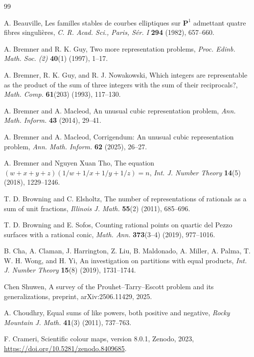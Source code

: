 \documentclass[10pt]{article}
\begin{document}
\begin{thebibliography}{99}

A. Beauville, Les familles stables de courbes elliptiques sur $\mathbf{P}^1$ admettant quatre fibres singuli\`eres, \textit{C. R. Acad. Sci., Paris, S\'er. I} \textbf{294} (1982), 657--660.

A. Bremner and R. K. Guy, Two more representation problems, \textit{Proc. Edinb. Math. Soc. (2)} \textbf{40}(1) (1997), 1--17.

A. Bremner, R. K. Guy, and R. J. Nowakowski, Which integers are representable as the product of the sum of three integers with the sum of their reciprocals?, \textit{Math. Comp.} \textbf{61}(203) (1993), 117--130.

A. Bremner and A. Macleod, An unusual cubic representation problem, \textit{Ann. Math. Inform.} \textbf{43} (2014), 29--41.

A. Bremner and A. Macleod, Corrigendum: An unusual cubic representation problem, \textit{Ann. Math. Inform.} \textbf{62} (2025), 26--27.

A. Bremner and Nguyen Xuan Tho, The equation $(w+x+y+z)(1/w+1/x+1/y+1/z)=n$, \textit{Int. J. Number Theory} \textbf{14}(5) (2018), 1229--1246.

T. D. Browning and C. Elsholtz, The number of representations of rationals as a sum of unit fractions, \textit{Illinois J. Math.} \textbf{55}(2) (2011), 685--696.

T. D. Browning and E. Sofos, Counting rational points on quartic del Pezzo surfaces with a rational conic, \textit{Math. Ann.} \textbf{373}(3--4) (2019), 977--1016.

B. Cha, A. Claman, J. Harrington, Z. Liu, B. Maldonado, A. Miller, A. Palma, T. W. H. Wong, and H. Yi, An investigation on partitions with equal products, \textit{Int. J. Number Theory} \textbf{15}(8) (2019), 1731--1744.

Chen Shuwen, A survey of the Prouhet--Tarry--Escott problem and its generalizations, preprint, arXiv:2506.11429, 2025.

A. Choudhry, Equal sums of like powers, both positive and negative, \textit{Rocky Mountain J. Math.} \textbf{41}(3) (2011), 737--763.

F. Crameri, Scientific colour maps, version 8.0.1, Zenodo, 2023, \url{https://doi.org/10.5281/zenodo.8409685}.


\end{thebibliography}
\end{document}
